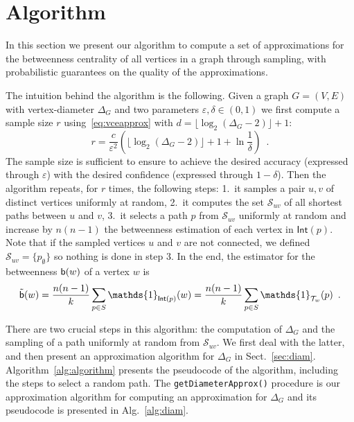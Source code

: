 \section{Algorithm}\label{sec:algo}
In this section we present our algorithm to compute a set of approximations for the
betweenness centrality of all vertices in a graph through sampling, with
probabilistic guarantees on the quality of the approximations.

The intuition behind the algorithm is the following. Given a graph $G=(V,E)$
with vertex-diameter $\Delta_G$ and two parameters $\varepsilon,\delta\in(0,1)$
we first compute a sample size $r$ using~\eqref{eq:vceapprox} with
$d=\lfloor\log_2(\Delta_G-2)\rfloor+1$:
\begin{equation}\label{eq:samplesize}
r=\frac{c}{\varepsilon^2}\left(\lfloor\log_2(\Delta_G-2)\rfloor+1+\ln\frac{1}{\delta}\right)\enspace.
\end{equation}
The sample size is sufficient to ensure to achieve the desired accuracy
(expressed through $\varepsilon$) with the desired confidence (expressed through
$1-\delta$). Then the algorithm repeats, for $r$ times, the following steps:
1.~it samples a pair $u,v$ of distinct vertices uniformly at random, 2.~it
computes the set $\mathcal{S}_{uv}$ of all shortest paths between $u$ and $v$,
3.~it selects a path $p$ from $\mathcal{S}_{uv}$ uniformly at random and
increase by $n(n-1)$ the betweenness estimation of each vertex in
$\mathsf{Int}(p)$. Note that if the sampled vertices $u$ and $v$ are not
connected, we defined $\mathcal{S}_{uv}=\{p_\emptyset\}$ so nothing is done in
step 3. In the end, the estimator for the betweenness $\mathsf{b}(w)$ of a vertex $w$
is 
\[
\tilde\betw(w) = \frac{n(n-1)}{k}\sum_{p\in S}
\mathds{1}_{\mathsf{Int}(p)}(w) = \frac{n(n-1)}{k}\sum_{p\in S}
\mathds{1}_{\mathcal{T}_w}(p)\enspace.
\]

There are two crucial steps in this algorithm: the computation of $\Delta_G$ and
the sampling of a path uniformly at random from $\mathcal{S}_{uv}$. We first
deal with the latter, and then present an approximation algorithm for $\Delta_G$
in Sect.~\ref{sec:diam}. Algorithm~\ref{alg:algorithm} presents the
pseudocode of the algorithm, including the steps to select a random path.
The \texttt{getDiameterApprox()} procedure is our approximation algorithm for
computing an approximation for $\Delta_G$ and its pseudocode is presented in
Alg.~\ref{alg:diam}.

